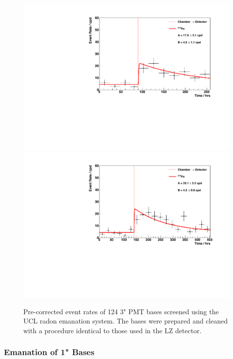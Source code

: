 \begin{figure}[h!]
    \centering
    \includegraphics[scale=0.42]{Chapter_4/Figures/ucl_measurements/3_inch_bases_first_Po214.pdf}
    \includegraphics[scale=0.42]{Chapter_4/Figures/ucl_measurements/3_inch_bases_second_Po214.pdf}
    \caption[Pre-corrected \PoTOF{} event rate results obtained from the two measurements made on the 124 3" PMT bases screened using the UCL radon emanation system.]
    {Pre-corrected \PoTOF{} event rates of 124 3" PMT bases screened using the UCL radon emanation system. The bases were prepared and cleaned with a procedure identical to those used in the LZ detector.}
    \label{fig:3_inch_pmt_base_results}
\end{figure}
%


\subsubsection{Emanation of 1" Bases}

